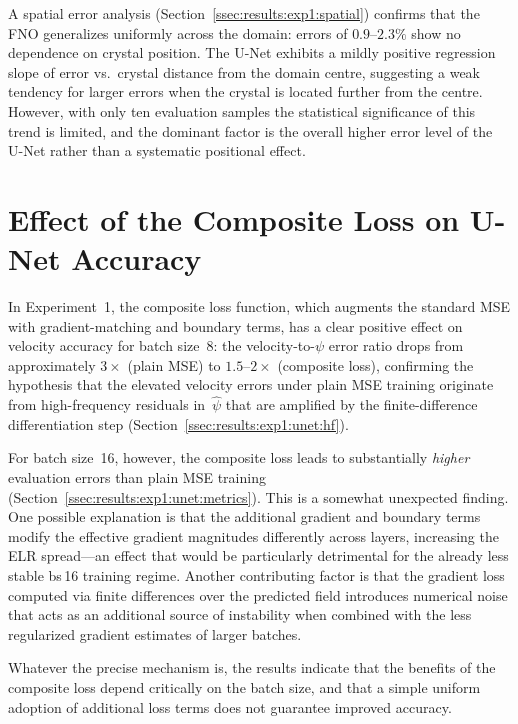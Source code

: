 A spatial error analysis (Section~\ref{ssec:results:exp1:spatial}) confirms that the FNO generalizes uniformly across the domain: errors of $0.9$–$2.3\%$ show no dependence on crystal position. The U-Net exhibits a mildly positive regression slope of error vs.\ crystal distance from the domain centre, suggesting a weak tendency for larger errors when the crystal is located further from the centre. However, with only ten evaluation samples the statistical significance of this trend is limited, and the dominant factor is the overall higher error level of the U-Net rather than a systematic positional effect.

\section{Effect of the Composite Loss on U-Net Accuracy}

In Experiment~1, the composite loss function, which augments the standard MSE with gradient-matching and boundary terms, has a clear positive effect on velocity accuracy for batch size~8: the velocity-to-$\psi$ error ratio drops from approximately $3\times$ (plain MSE) to $1.5$--$2\times$ (composite loss), confirming the hypothesis that the elevated velocity errors under plain MSE training originate from high-frequency residuals in~$\hat\psi$ that are amplified by the finite-difference differentiation step (Section~\ref{ssec:results:exp1:unet:hf}).

For batch size~16, however, the composite loss leads to substantially \emph{higher} evaluation errors than plain MSE training (Section~\ref{ssec:results:exp1:unet:metrics}). This is a somewhat unexpected finding. One possible explanation is that the additional gradient and boundary terms modify the effective gradient magnitudes differently across layers, increasing the ELR spread—an effect that would be particularly detrimental for the already less stable bs\,16 training regime. Another contributing factor is that the gradient loss computed via finite differences over the predicted field introduces numerical noise that acts as an additional source of instability when combined with the less regularized gradient estimates of larger batches.

Whatever the precise mechanism is, the results indicate that the benefits of the composite loss depend critically on the batch size, and that a simple uniform adoption of additional loss terms does not guarantee improved accuracy.

